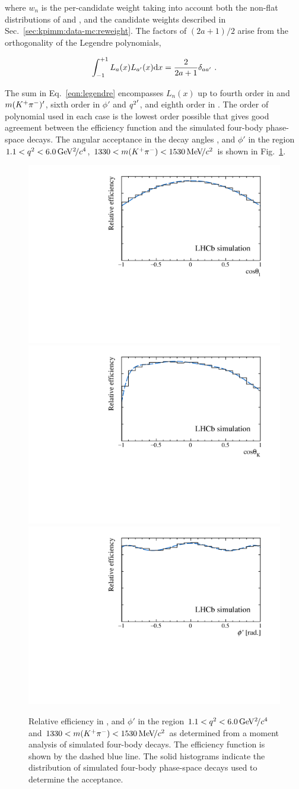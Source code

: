 \noindent where $w_{n}$ is the per-candidate weight taking into account both the non-flat distributions of \qsq and \mkpi, and the candidate weights described in Sec.~\ref{sec:kpimm:data-mc:reweight}. The factors of $(2a + 1)/2$ arise from the orthogonality of the Legendre polynomials,
 
\begin{equation}
\int_{-1}^{+1} L_{a}(x) L_{a'}(x) \mathrm{d} x = \frac{2}{2 a + 1}\delta_{ a a'}  ~.
\end{equation}

 The sum in Eq.~\ref{eqn:legendre} encompasses $L_n(x)$ up to fourth order in \ctl and $m({{K}^+}{{\pi}^-})'$, sixth order in $\phi'$ and ${q^2}'$, and eighth order in \ctk. The order of polynomial used in each case is the lowest order possible that gives good agreement between the efficiency function and the simulated four-body \BdToKpimm phase-space decays. The angular acceptance in the decay angles \ctl, \ctk and $\phi'$ in the region $1.1<{q^2}<6.0{\mathrm{\,Ge\kern -0.1em V^2\!/}c^4}$, $1330<m({{K}^+}{{\pi}^-})<1530{\mathrm{\,Me\kern -0.1em V\!/}c^2}$ is shown in Fig.~\ref{fig:acceptance}.

\begin{figure}[!tb]
  \centering
  \includegraphics[width=0.49\linewidth]{figs/kpimm/acceptance/ctl.pdf}
  \includegraphics[width=0.49\linewidth]{figs/kpimm/acceptance/ctk.pdf}\\
  \includegraphics[width=0.5\linewidth]{figs/kpimm/acceptance/phi.pdf}
  \caption{Relative efficiency in \ctl, \ctk and $\phi'$ in the region $1.1<{q^2}<6.0{\mathrm{\,Ge\kern -0.1em V^2\!/}c^4}$ and $1330<m({{K}^+}{{\pi}^-})<1530{\mathrm{\,Me\kern -0.1em V\!/}c^2}$ as determined from a moment analysis of simulated four-body \BdToKpimm decays. The efficiency function is shown by the dashed blue line.  The solid histograms indicate the distribution of simulated four-body \BdToKpimm phase-space decays used to determine the acceptance.}
\label{fig:acceptance}
\end{figure}
